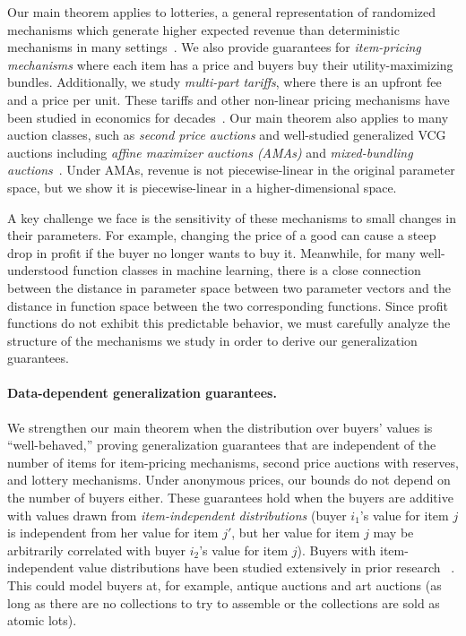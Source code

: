 Our main theorem applies to lotteries, a general representation of randomized mechanisms which generate higher expected revenue than deterministic mechanisms in many settings~\citep{Conitzer03:Applications, Dobzinski09:Power}.
We also provide guarantees for \emph{item-pricing mechanisms} where each item has a price and buyers buy their utility-maximizing bundles. Additionally, we study \emph{multi-part tariffs}, where there is an upfront fee and a price per unit. These tariffs and other non-linear pricing mechanisms have been studied in economics for decades~\citep{Oi71:Disneyland, Feldstein72:Equity, Wilson93:Nonlinear}. 
Our main theorem also applies to many auction classes, such as \emph{second price auctions} and well-studied generalized VCG auctions including \emph{affine maximizer auctions (AMAs)} and \emph{mixed-bundling auctions}~\citep{Sandholm15:Automated, Roberts79:Characterization, Lavi03:Towards, Dobzinski08:Characterizations, Jehiel07:Mixed}. Under AMAs, revenue is not piecewise-linear in the original parameter space, but we show it is piecewise-linear in a higher-dimensional space.

A key challenge we face is the sensitivity of these mechanisms to small changes in their parameters. For example, changing the price of a good can cause a steep drop in profit if the buyer no longer wants to buy it. Meanwhile, for many well-understood function classes in machine learning, there is a close connection between the distance in parameter space between two parameter vectors and the distance in function space between the two corresponding functions. Since profit functions do not exhibit this predictable behavior, we must carefully analyze the structure of the mechanisms we study in order to derive our generalization guarantees.

\paragraph{Data-dependent generalization guarantees.} We strengthen our main theorem when the distribution over buyers' values is ``well-behaved,'' proving generalization guarantees that are independent of the number of items for item-pricing mechanisms, second price auctions with reserves, and lottery mechanisms. Under anonymous prices, our bounds do not depend on the number of buyers either. These guarantees hold when the buyers are additive with values drawn from \emph{item-independent distributions} (buyer $i_1$'s value for item $j$ is independent from her value for item $j'$, but her value for item $j$ may be arbitrarily correlated with buyer $i_2$'s value for item $j$). Buyers with item-independent value distributions have been studied extensively in prior research~ \citep{Cai17:Learning, Yao14:n, Cai16:Duality, Goldner16:Prior, Babaioff17:Menu, Chawla07:Algorithmic, Hart12:Approximate}. This could model buyers at, for example, antique auctions and art auctions (as long as there are no collections to try to assemble or the collections are sold as atomic lots).


